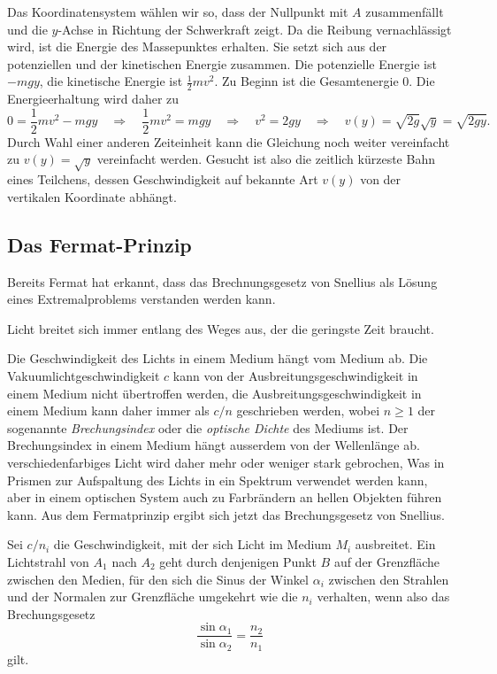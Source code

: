 Das Koordinatensystem wählen wir so, dass der Nullpunkt mit $A$ zusammenfällt
und die $y$-Achse in Richtung der Schwerkraft zeigt.
Da die Reibung vernachlässigt wird, ist die Energie des Massepunktes
erhalten.
Sie setzt sich aus der potenziellen und der kinetischen Energie
zusammen.
Die potenzielle Energie ist $-mgy$, die kinetische Energie ist
$\frac12mv^2$.
Zu Beginn ist die Gesamtenergie 0.
Die Energieerhaltung wird daher zu
\[
0=\frac12mv^2-mgy
\quad\Rightarrow\quad
\frac12mv^2=mgy
\quad\Rightarrow\quad
v^2=2gy
\quad\Rightarrow\quad
v(y)
=
\sqrt{2g}\!\sqrt{y}
=
\!\sqrt{2gy}.
\]
Durch Wahl einer anderen Zeiteinheit kann die Gleichung noch weiter
vereinfacht zu
\(
v(y) = \sqrt{y}
\)
vereinfacht werden.
Gesucht ist also die zeitlich kürzeste Bahn eines Teilchens, 
dessen Geschwindigkeit auf bekannte Art $v(y)$ von der vertikalen
Koordinate abhängt.

%
%
\subsection{Das Fermat-Prinzip}
Bereits Fermat hat erkannt, dass das Brechnungsgesetz von Snellius
als Lösung eines Extremalproblems verstanden werden kann.

\begin{satz}
\label{buch:variation:problem:satz:fermat-prinzip}
Licht breitet sich immer entlang des Weges aus, der die geringste
Zeit braucht.
\end{satz}

Die Geschwindigkeit des Lichts in einem Medium hängt vom Medium ab.
Die Vakuumlichtgeschwindigkeit $c$ kann von der Ausbreitungsgeschwindigkeit
in einem Medium nicht übertroffen werden, die Ausbreitungsgeschwindigkeit
in einem Medium kann daher immer als $c/n$ geschrieben werden, wobei
$n\ge 1$ der sogenannte {\em Brechungsindex} oder die {\em optische Dichte}
des Mediums ist.
%
%
%
Der Brechungsindex in einem Medium hängt ausserdem von der Wellenlänge ab.
verschiedenfarbiges Licht wird daher mehr oder weniger stark gebrochen,
Was in Prismen zur Aufspaltung des Lichts in ein Spektrum verwendet
werden kann, aber in einem optischen System auch zu Farbrändern an
hellen Objekten führen kann.
Aus dem Fermatprinzip ergibt sich jetzt das Brechungsgesetz von 
Snellius.

\begin{satz}[Snellius]
\label{buch:variation:problem:satz:snellius}
Sei $c/n_i$ die Geschwindigkeit, mit der sich Licht im Medium $M_i$
ausbreitet.
Ein Lichtstrahl von $A_1$ nach $A_2$ geht durch denjenigen Punkt $B$ 
auf der Grenzfläche zwischen den Medien, für den sich die Sinus der
Winkel $\alpha_i$ zwischen den Strahlen und der Normalen zur Grenzfläche
umgekehrt wie die $n_i$ verhalten, wenn also das Brechungsgesetz
\[
\frac{\sin\alpha_1}{\sin\alpha_2}
=
\frac{n_2}{n_1}
\]
gilt.
\end{satz}

